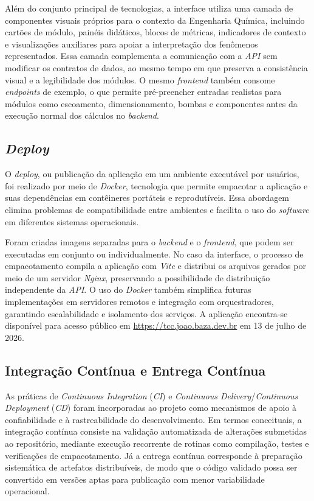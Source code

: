 Além do conjunto principal de tecnologias, a interface utiliza uma camada de componentes visuais próprios para o contexto da Engenharia Química, incluindo cartões de módulo, painéis didáticos, blocos de métricas, indicadores de contexto e visualizações auxiliares para apoiar a interpretação dos fenômenos representados. Essa camada complementa a comunicação com a \textit{API} sem modificar os contratos de dados, ao mesmo tempo em que preserva a consistência visual e a legibilidade dos módulos. O mesmo \textit{frontend} também consome \textit{endpoints} de exemplo, o que permite pré-preencher entradas realistas para módulos como escoamento, dimensionamento, bombas e componentes antes da execução normal dos cálculos no \textit{backend}.

\subsection{\textit{Deploy}}
O \textit{deploy}, ou publicação da aplicação em um ambiente executável por usuários, foi realizado por meio de \textit{Docker}, tecnologia que permite empacotar a aplicação e suas dependências em contêineres portáteis e reprodutíveis. Essa abordagem elimina problemas de compatibilidade entre ambientes e facilita o uso do \textit{software} em diferentes sistemas operacionais.

Foram criadas imagens separadas para o \textit{backend} e o \textit{frontend}, que podem ser executadas em conjunto ou individualmente. No caso da interface, o processo de empacotamento compila a aplicação com \textit{Vite} e distribui os arquivos gerados por meio de um servidor \textit{Nginx}, preservando a possibilidade de distribuição independente da \textit{API}. O uso do \textit{Docker} também simplifica futuras implementações em servidores remotos e integração com orquestradores, garantindo escalabilidade e isolamento dos serviços. A aplicação encontra-se disponível para acesso público em \url{https://tcc.joao.baza.dev.br} em 13 de julho de 2026.

\subsection{Integração Contínua e Entrega Contínua}

As práticas de \textit{Continuous Integration} (\textit{CI}) e \textit{Continuous Delivery}/\textit{Continuous Deployment} (\textit{CD}) foram incorporadas ao projeto como mecanismos de apoio à confiabilidade e à rastreabilidade do desenvolvimento. Em termos conceituais, a integração contínua consiste na validação automatizada de alterações submetidas ao repositório, mediante execução recorrente de rotinas como compilação, testes e verificações de empacotamento. Já a entrega contínua corresponde à preparação sistemática de artefatos distribuíveis, de modo que o código validado possa ser convertido em versões aptas para publicação com menor variabilidade operacional.

